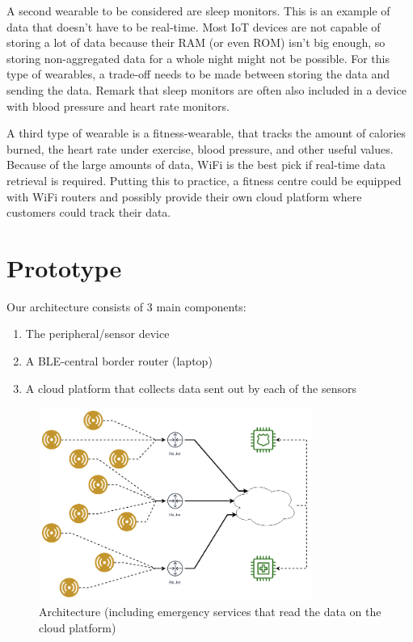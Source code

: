 \documentclass[12pt, a4paper]{article}
\newcommand{\wifi}{WiFi}
\newcommand{\bles}{BLE}
\newcommand{\iot}{IoT}
\begin{document}
A second wearable to be considered are sleep monitors. This is an example of data that doesn't have to be real-time. Most \iot{} devices are not capable of storing a lot of data because their RAM (or even ROM) isn't big enough, so storing non-aggregated data for a whole night might not be possible. For this type of wearables, a trade-off needs to be made between storing the data and sending the data. Remark that sleep monitors are often also included in a device with blood pressure and heart rate monitors.

A third type of wearable is a fitness-wearable, that tracks the amount of calories burned, the heart rate under exercise, blood pressure, and other useful values. Because of the large amounts of data, \wifi{} is the best pick if real-time data retrieval is required. Putting this to practice, a fitness centre could be equipped with \wifi{} routers and possibly provide their own cloud platform where customers could track their data.

\section{Prototype}
\label{sec:prototype}

Our architecture consists of 3 main components:
\begin{enumerate}
    \item The peripheral/sensor device
    \item A \bles{}-central border router (laptop)
    \item A cloud platform that collects data sent out by each of the sensors
\end{enumerate}

\begin{figure}[htbp]
\includegraphics[width=0.8\textwidth]{images/architecture.png}
\centering
\caption{Architecture (including emergency services that read the data on the cloud platform)}
\end{figure}
\end{document}
